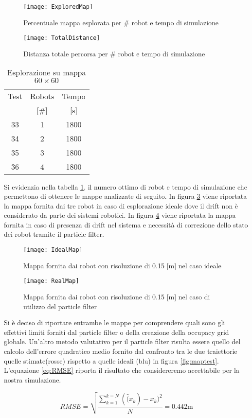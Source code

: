 \begin{figure}[htb]
	\centering
	\texttt{[image: ExploredMap]}
	\caption{Percentuale mappa esplorata per \# robot e tempo di simulazione}
	\label{fig:ExploredMap}
\end{figure}
%
\begin{figure}[htb]
	\centering
	\texttt{[image: TotalDistance]}
	\caption{Distanza totale percorsa per \# robot e tempo di simulazione}
	\label{fig:TotalDistance}
\end{figure}
\begin{table}[htb]
	\centering
	\caption{Esplorazione su mappa $60 \times 60$}
	\label{tab:optimalresults}
	\begin{tabular}{ccc}
	\toprule
	Test 		& 	Robots		&		Tempo\\
				&	[\#]			&		[\si{\second}]\\
	\midrule
      								33    &		1	 	& 1800\\
		 							34	& 		2 		& 1800\\
	\rowcolor[gray]{.9} 	35	& 		3 		& 1800\\
									36 	& 		4 		& 1800\\
     \bottomrule
\end{tabular}
\end{table}
%
\noindent 
Si evidenzia nella tabella \ref{tab:optimalresults}, il numero ottimo di robot 
e tempo di simulazione che permettono di ottenere le mappe analizzate di seguito.
In figura \ref{fig:IdealMap} viene riportata la mappa fornita dai tre robot in
caso di esplorazione ideale dove il drift non è considerato da parte dei sistemi
robotici.
In figura \ref{fig:RealMap} viene riportata la mappa fornita in caso di presenza
di drift nel sistema e necessità di correzione dello stato dei robot tramite il
particle filter.
\begin{figure}[htb]
	\centering
	\texttt{[image: IdealMap]}
	\caption{Mappa fornita dai robot con risoluzione di 0.15 [m] nel caso ideale}
\label{fig:IdealMap}
\end{figure}

\begin{figure}[!htb]
	\centering
	\texttt{[image: RealMap]}
	\caption{Mappa fornita dai robot con risoluzione di 0.15 [m] nel caso di utilizzo del particle filter }
\label{fig:RealMap}
\end{figure}

Si è deciso di riportare entrambe le mappe per comprendere quali sono gli effettivi 
limiti forniti dal particle filter o della creazione della occupacy grid globale.
Un'altro metodo valutativo per il particle filter risulta essere quello del
calcolo dell'errore quadratico medio fornito dal confronto tra le due traiettorie quelle
stimate(rosse) rispetto a quelle ideali (blu) in figura \ref{fig:maptest}. L'equazione \ref{eq:RMSE} riporta il risultato che considereremo accettabile per la nostra simulazione.

\begin{equation}
RMSE = \sqrt{ \frac{\sum_{k=1}^{k=N}(\hat(x_{k}) - x_{k})^2 }{N}} = 0.442 \si{\metre}
\label{eq:RMSE}
\end{equation}